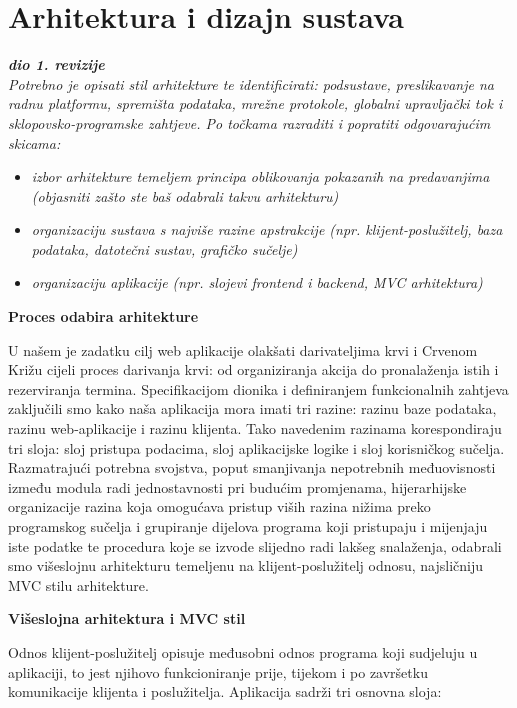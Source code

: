 \chapter{Arhitektura i dizajn sustava}
		
		\textbf{\textit{dio 1. revizije}}\\

		\textit{ Potrebno je opisati stil arhitekture te identificirati: podsustave, preslikavanje na radnu platformu, spremišta podataka, mrežne protokole, globalni upravljački tok i sklopovsko-programske zahtjeve. Po točkama razraditi i popratiti odgovarajućim skicama:}
	\begin{itemize}
		\item 	\textit{izbor arhitekture temeljem principa oblikovanja pokazanih na predavanjima (objasniti zašto ste baš odabrali takvu arhitekturu)}
		\item 	\textit{organizaciju sustava s najviše razine apstrakcije (npr. klijent-poslužitelj, baza podataka, datotečni sustav, grafičko sučelje)}
		\item 	\textit{organizaciju aplikacije (npr. slojevi frontend i backend, MVC arhitektura) }		
	\end{itemize}
	
	
	
	
	
	\begin{packed_item}
	\item \textbf{Proces odabira arhitekture}
	\end{packed_item}
		U našem je zadatku cilj web aplikacije olakšati darivateljima krvi i Crvenom Križu cijeli proces darivanja krvi: od organiziranja akcija do pronalaženja istih i rezerviranja termina. Specifikacijom dionika i definiranjem funkcionalnih zahtjeva zaključili smo kako naša aplikacija mora imati tri razine: razinu baze podataka, razinu web-aplikacije i razinu klijenta. Tako navedenim razinama korespondiraju tri sloja: sloj pristupa podacima, sloj aplikacijske logike i sloj korisničkog sučelja. Razmatrajući potrebna svojstva, poput smanjivanja nepotrebnih međuovisnosti između modula radi jednostavnosti pri budućim promjenama, hijerarhijske organizacije razina koja omogućava pristup viših razina nižima preko programskog sučelja i grupiranje dijelova programa koji pristupaju i mijenjaju iste podatke te procedura koje se izvode slijedno radi lakšeg snalaženja, odabrali smo višeslojnu arhitekturu temeljenu na klijent-poslužitelj odnosu, najsličniju MVC stilu arhitekture.
	
	\begin{packed_item}
	\item \textbf{Višeslojna arhitektura i MVC stil}
	\end{packed_item}
		Odnos klijent-poslužitelj opisuje međusobni odnos programa koji sudjeluju u aplikaciji, to jest njihovo funkcioniranje prije, tijekom i po završetku komunikacije klijenta i poslužitelja. Aplikacija sadrži tri osnovna sloja: 
	
